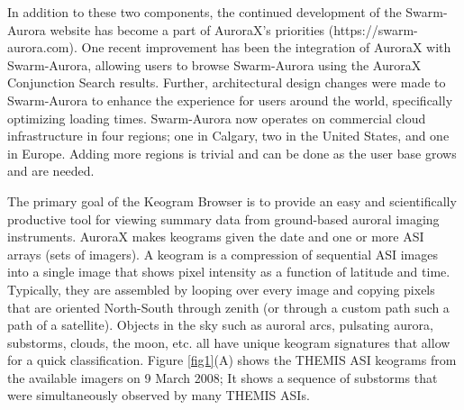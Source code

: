 \documentclass[utf8]{FrontiersinHarvard} %
\begin{document}
In addition to these two components, the continued development of the Swarm-Aurora website has become a part of AuroraX’s priorities (https://swarm-aurora.com). One recent improvement has been the integration of AuroraX with Swarm-Aurora, allowing users to browse Swarm-Aurora using the AuroraX Conjunction Search results. Further, architectural design changes were made to Swarm-Aurora to enhance the experience for users around the world, specifically optimizing loading times. Swarm-Aurora now operates on commercial cloud infrastructure in four regions; one in Calgary, two in the United States, and one in Europe. Adding more regions is trivial and can be done as the user base grows and are needed.


The primary goal of the Keogram Browser is to provide an easy and scientifically productive tool for viewing summary data from ground-based auroral imaging instruments. AuroraX makes keograms given the date and one or more ASI arrays (sets of imagers). A keogram is a compression of sequential ASI images into a single image that shows pixel intensity as a function of latitude and time. Typically, they are assembled by looping over every image and copying pixels that are oriented North-South through zenith (or through a custom path such a path of a satellite). Objects in the sky such as auroral arcs, pulsating aurora, substorms, clouds, the moon, etc. all have unique keogram signatures that allow for a quick classification. Figure \ref{fig1}(A) shows the THEMIS ASI keograms from the available imagers on 9 March 2008; It shows a sequence of substorms that were simultaneously observed by many THEMIS ASIs. 
\end{document}
